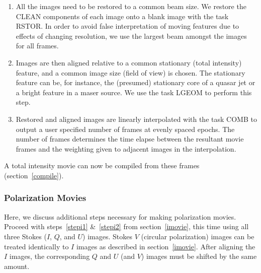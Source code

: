 \documentclass[twoside]{article}
\begin{document}
\begin{enumerate}

\item
\label{stepi1}
All the images need to be restored to a common beam size. We restore
the CLEAN components of each image onto a blank image with the task
RSTOR. In order to avoid false interpretation of moving features due to
effects of changing resolution, we use the largest beam amongst the images
for all frames.

\item
\label{stepi2}
Images are then aligned relative to a common stationary (total intensity)
feature, and a common image size (field of view) is chosen. The stationary
feature can be, for instance, the (presumed) stationary core of a quasar
jet or a bright feature in a maser source. We use the task LGEOM to
perform this step.

\item
\label{stepi3}
Restored and aligned images are linearly interpolated with the task
COMB to output a user specified number of frames at evenly spaced
epochs. The number of frames determines the time elapse between the
resultant movie frames and the weighting given to adjacent images
in the interpolation.

\end{enumerate}

\noindent A total intensity movie can now be compiled from these frames
(section~\ref{compile}).

\subsubsection{Polarization Movies}

Here, we discuss additional steps necessary for making polarization
movies. Proceed with steps~\ref{stepi1} \&~\ref{stepi2} from
section~\ref{imovie}, this time using all three Stokes ($I$, $Q$, and $U$)
images. Stokes $V$ (circular polarization) images can be treated
identically to $I$ images as described in section~\ref{imovie}. After
aligning the $I$ images, the corresponding $Q$ and $U$ (and $V$) images
must be shifted by the same amount.
\end{document}
